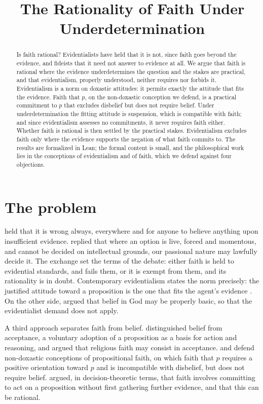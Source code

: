 \documentclass{situationist-preprint}
\title{The Rationality of Faith Under Underdetermination}
\begin{document}
\maketitle

\begin{abstract}
Is faith rational? Evidentialists have held that it is not, since faith goes beyond the evidence, and fideists that it need not answer to evidence at all. We argue that faith is rational where the evidence underdetermines the question and the stakes are practical, and that evidentialism, properly understood, neither requires nor forbids it. Evidentialism is a norm on doxastic attitudes: it permits exactly the attitude that fits the evidence. Faith that $p$, on the non-doxastic conception we defend, is a practical commitment to $p$ that excludes disbelief but does not require belief. Under underdetermination the fitting attitude is suspension, which is compatible with faith; and since evidentialism assesses no commitments, it never requires faith either. Whether faith is rational is then settled by the practical stakes. Evidentialism excludes faith only where the evidence supports the negation of what faith commits to. The results are formalized in Lean; the formal content is small, and the philosophical work lies in the conceptions of evidentialism and of faith, which we defend against four objections.
\end{abstract}

\section{The problem}

\citet{Clifford1877} held that it is wrong always, everywhere and for anyone to believe anything upon insufficient evidence. \citet{James1896} replied that where an option is live, forced and momentous, and cannot be decided on intellectual grounds, our passional nature may lawfully decide it. The exchange set the terms of the debate: either faith is held to evidential standards, and fails them, or it is exempt from them, and its rationality is in doubt. Contemporary evidentialism states the norm precisely: the justified attitude toward a proposition is the one that fits the agent's evidence \citep{ConeeFeldman1985}. On the other side, \citet{Plantinga1983} argued that belief in God may be properly basic, so that the evidentialist demand does not apply.

A third approach separates faith from belief. \citet{Alston1996} distinguished belief from acceptance, a voluntary adoption of a proposition as a basis for action and reasoning, and argued that religious faith may consist in acceptance. \citet{Audi2011} and \citet{HowardSnyder2013} defend non-doxastic conceptions of propositional faith, on which faith that $p$ requires a positive orientation toward $p$ and is incompatible with disbelief, but does not require belief. \citet{Buchak2012} argued, in decision-theoretic terms, that faith involves committing to act on a proposition without first gathering further evidence, and that this can be rational.
\end{document}
